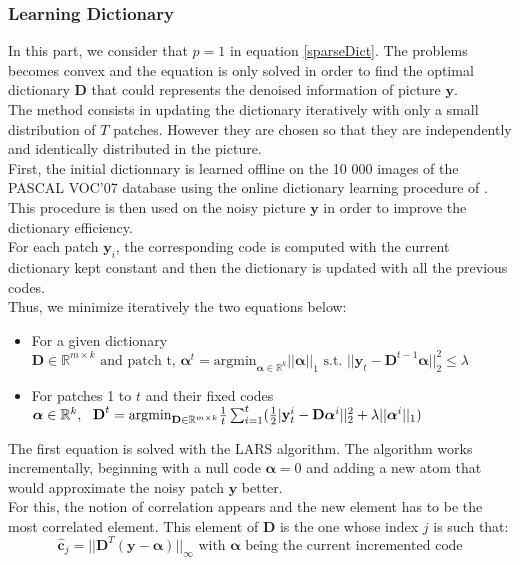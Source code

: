 \documentclass{ipol}
\newcommand{\psize}{m}
\newcommand{\dsize}{k}
\newcommand{\dict}{\textbf{D}}
\newcommand{\code}{\bm{\alpha}}
\newcommand{\pnorm}{p}
\newcommand{\noi}{\textbf{y}}
\newcommand{\clars}{\hat{\textbf{c}}}
\newcommand{\RR}{\mathbb{R}}
\newcommand{\argmin}{\text{argmin}}
\begin{document}
\subsubsection{Learning Dictionary}

In this part, we consider that $\pnorm = 1$ in equation \eqref{sparseDict}. The problems becomes convex and the equation is only solved in order to find the optimal dictionary $\dict$ that could represents the denoised information of picture $\noi$.\\
The method consists in updating the dictionary iteratively with only a small distribution of $T$ patches. However they are chosen so that they are independently and identically distributed in the picture.\\
First, the initial dictionnary is learned offline on the 10 000 images of the PASCAL VOC'07 database using the  online dictionary learning procedure of \cite{onlineLearning}. This procedure is then used on the noisy picture $\noi$ in order to improve the dictionary efficiency.\\
For each patch $\noi_i$, the corresponding code is computed with the current dictionary kept constant and then the dictionary is updated with all the previous codes.\\
Thus, we minimize iteratively the two equations below:
\begin{itemize}
	\item For a given dictionary $\dict \in \RR^{\psize \times \dsize} \text{ and patch t, } \code^t = \argmin_{\code \in \RR^\dsize} ||\code||_1 \text{ s.t. } ||\noi_t - \dict^{t-1} \code||_2^2 \leq \lambda$
	\item For patches 1 to $t$ and their fixed codes $\code \in \RR^\dsize , \ \ \dict^{t}= \argmin_{\dict \in \RR^{\psize \times \dsize}} \frac{1}{t} \sum_{i=1}^t (\frac{1}{2}|\textbf{\noi}_t^i - \dict \code^i||^2_2 + \lambda ||\code^i||_1)$
\end{itemize}
The first equation is solved with the LARS algorithm. The algorithm works incrementally, beginning with a null code $\code = 0$ and adding a new atom that would approximate the noisy patch $\noi$ better.\\
For this, the notion of correlation appears and the new element has to be the most correlated element. This element of $\dict$ is the one whose index $j$ is such that:
\begin{equation*}
	\clars_j = ||\dict^T(\noi - \code)||_{\infty} \text{ with $\code$ being the current incremented code}
\end{equation*}
\end{document}
